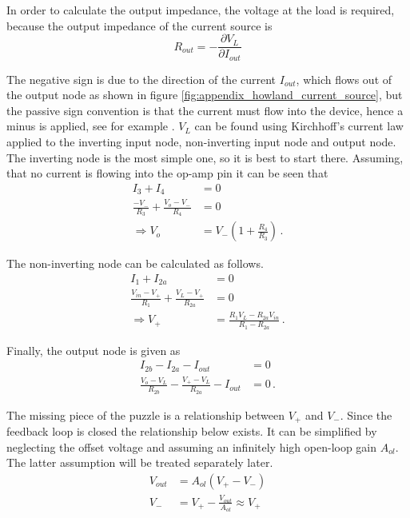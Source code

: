 \documentclass[12pt]{book}
\begin{document}
In order to calculate the output impedance, the voltage at the load is required, because the output impedance of the current source is
\begin{equation}
     R_{out} = -\frac{\partial V_L}{\partial I_{out}}
\end{equation}

The negative sign is due to the direction of the current $I_{out}$, which flows out of the output node as shown in figure \ref{fig:appendix_howland_current_source}, but the passive sign convention is that the current must flow into the device, hence a minus is applied, see for example \cite{NoiseInSemiconductorDevices}. $V_L$ can be found using Kirchhoff's current law applied to the inverting input node, non-inverting input node and output node. The inverting node is the most simple one, so it is best to start there. Assuming, that no current is flowing into the op-amp pin it can be seen that
\begin{align}
    I_3 + I_4 &= 0 \nonumber\\
    \frac{-V_-}{R_3} + \frac{V_o - V_-}{R_4} &= 0\nonumber\\
    \Rightarrow V_o &= V_-\left(1 + \frac{R_4}{R_3}\right)\,.\label{eqn:howland_inverting}
\end{align}

The non-inverting node can be calculated as follows.
\begin{align}
    I_1 + I_{2a} &= 0 \nonumber\\
    \frac{V_{in} - V_+}{R_1} + \frac{V_L-V_+}{R_{2a}} &= 0\nonumber\\
    \Rightarrow V_+ &= \frac{R_1 V_L - R_{2a} V_{in}}{R_1 - R_{2a}} \,.\label{eqn:howland_non-inverting}
\end{align}

Finally, the output node is given as
\begin{align}
     I_{2b} -I_{2a} - I_{out} &= 0 \nonumber\\
    \frac{V_o - V_L}{R_{2b}} - \frac{V_+-V_L}{R_{2a}} - I_{out} &= 0\,.\label{eqn:howland_output}
\end{align}

The missing piece of the puzzle is a relationship between $V_+$ and $V_-$. Since the feedback loop is closed the relationship below exists. It can be simplified by neglecting the offset voltage and assuming an infinitely high open-loop gain $A_{ol}$. The latter assumption will be treated separately later.
\begin{align}
    V_{out} &= A_{ol} (V_+ - V_-) \nonumber\\
    V_- &= V_+ - \frac{V_{out}}{A_{ol}} \approx V_+\label{eqn:howland_op-amp_loop_gain}
\end{align}
\end{document}
